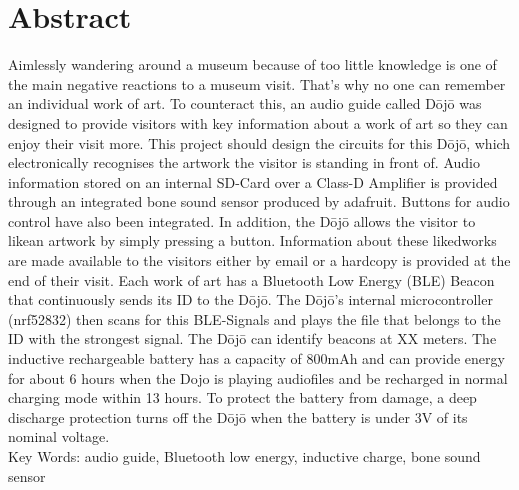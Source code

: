 \section*{Abstract}\label{sec:abstract}
Aimlessly wandering around a museum because of too little knowledge is one of the main negative reactions to a museum visit. That’s why no one can remember an individual work of art. To counteract this, an audio guide called Dōjō was designed to provide visitors with key information about a work of art so they can enjoy their visit more. This project should design the circuits for this Dōjō, which electronically recognises the artwork the visitor is standing in front of. Audio information stored on an internal SD-Card over a Class-D Amplifier is provided through an integrated bone sound sensor produced by adafruit. Buttons for audio control have also been integrated. In addition, the Dōjō allows the visitor to \glqq like\grqq an artwork by simply pressing a button. Information about these \glqq liked\grqq works are made available to the visitors either by email or a hardcopy is provided at the end of their visit. Each work of art has a Bluetooth Low Energy (BLE) Beacon that continuously sends its ID to the Dōjō. The Dōjō’s internal microcontroller (nrf52832) then scans for this BLE-Signals and plays the file that belongs to the ID with the strongest signal. The Dōjō can identify beacons at XX meters. The inductive rechargeable battery has a capacity of 800mAh and can provide energy for about 6 hours when the Dojo is playing audiofiles and be recharged in normal charging mode within 13 hours. To protect the battery from damage, a deep discharge protection turns off the Dōjō when the battery is under 3V of its nominal voltage.\\[0.25cm]
Key Words: audio guide, Bluetooth low energy, inductive charge, bone sound sensor